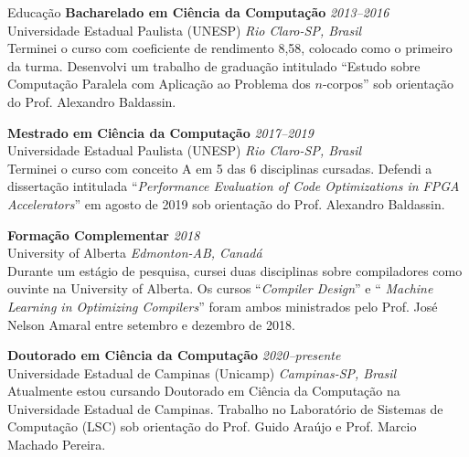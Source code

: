 \documentclass[a4paper]{resume}
\begin{document}

\begin{rSection}{Educação}
{\bf Bacharelado em Ciência da Computação} \hfill {\em 2013--2016} \\
{\sc Universidade Estadual Paulista (UNESP)} \hfill {\em Rio Claro-SP, Brasil} \\
Terminei o curso com coeficiente de rendimento 8,58, colocado como o primeiro da
turma. Desenvolvi um trabalho de graduação intitulado ``Estudo sobre Computação
Paralela com Aplicação ao Problema dos $n$-corpos'' sob orientação do Prof.
Alexandro Baldassin.

{\bf Mestrado em Ciência da Computação} \hfill {\em 2017--2019} \\
{\sc Universidade Estadual Paulista (UNESP)} \hfill {\em Rio Claro-SP, Brasil} \\
Terminei o curso com conceito A em 5 das 6 disciplinas cursadas. Defendi a
dissertação intitulada ``{\it Performance Evaluation of Code Optimizations in
FPGA Accelerators}'' em agosto de 2019 sob orientação do Prof. Alexandro
Baldassin.

{\bf Formação Complementar} \hfill {\em 2018} \\
{\sc University of Alberta} \hfill {\em Edmonton-AB, Canadá} \\
Durante um estágio de pesquisa, cursei duas disciplinas sobre compiladores como
ouvinte na University of Alberta. Os cursos ``{\em Compiler Design}'' e ``{\em
Machine Learning in Optimizing Compilers}'' foram ambos ministrados pelo Prof.
José Nelson Amaral entre setembro e dezembro de 2018.

{\bf Doutorado em Ciência da Computação} \hfill {\em 2020--presente} \\
{\sc Universidade Estadual de Campinas (Unicamp)} \hfill {\em Campinas-SP, Brasil} \\
Atualmente estou cursando Doutorado em Ciência da Computação na Universidade
Estadual de Campinas. Trabalho no Laboratório de Sistemas de Computação (LSC)
sob orientação do Prof. Guido Araújo e Prof. Marcio Machado Pereira.
\end{rSection}

\end{document}
